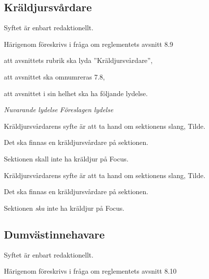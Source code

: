 \documentclass{article}
\newenvironment{lydelse}
    {\begin{paracol}{2}%
        \emph{Nuvarande lydelse}%
        \switchcolumn%
        \emph{Föreslagen lydelse}%
    \end{paracol}%
    \begin{enumerate}[label=\thesubsection.\arabic*]%
    \begin{paracol}{2}%
    }{\end{paracol}\end{enumerate}}
\begin{document}
\subsection{Kräldjursvårdare}
Syftet är enbart redaktionellt.

Härigenom föreskrivs i fråga om reglementets avsnitt 8.9

\begin{dels}
    \item att avsnittets rubrik ska lyda ''Kräldjursvårdare'',
    \item att avsnittet ska omnumreras 7.8,
    \item att avsnittet i sin helhet ska ha följande lydelse.
\end{dels}
\begin{lydelse}
    \setcounter{section}{8}
    \setcounter{subsection}{9}
    
    \item Kräldjursvårdarens syfte är att ta hand om sektionens slang, Tilde.

	\item Det ska finnas en kräldjursvårdare på sektionen.

	\item Sektionen skall inte ha kräldjur på Focus.
    
    \setcounter{section}{7}
    \setcounter{subsection}{8}
    \switchcolumn
    
    \item Kräldjursvårdarens syfte är att ta hand om sektionens slang, Tilde.

    \item Det ska finnas en kräldjursvårdare på sektionen.
    
    \item Sektionen \emph{ska} inte ha kräldjur på Focus.
    
\end{lydelse}

\subsection{Dumvästinnehavare}
Syftet är enbart redaktionellt.

Härigenom föreskrivs i fråga om reglementets avsnitt 8.10
\end{document}
